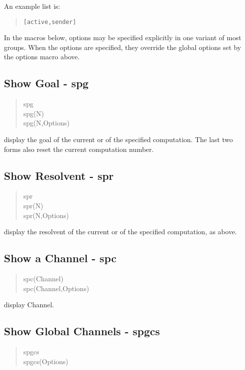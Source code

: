 \noindent
An example list is:

\begin{verse}
    \verb+[active,sender]+
\end{verse}

\noindent
In the macros below, options may be specified explicitly in one variant
of most groups.  When the options are specified, they override the
global options set by the options macro above.

\subsection{Show Goal - spg}

\begin{verse}
   spg \\
   spg(N) \\
   spg(N,Options)
\end{verse}

\noindent
display the goal of the current or of the specified computation.  The last
two forms also reset the current computation number.

\subsection{Show Resolvent - spr}

\begin{verse}
   spr \\
   spr(N) \\
   spr(N,Options)
\end{verse}

\noindent
display the resolvent of the current or of the specified computation, as above.

\subsection{Show a Channel - spc}

\begin{verse}
    spc(Channel) \\
    spc(Channel,Options)
\end{verse}

\noindent
display Channel.

\subsection{Show Global Channels - spgcs}

\begin{verse}
    spgcs \\
    spgcs(Options)
\end{verse}

